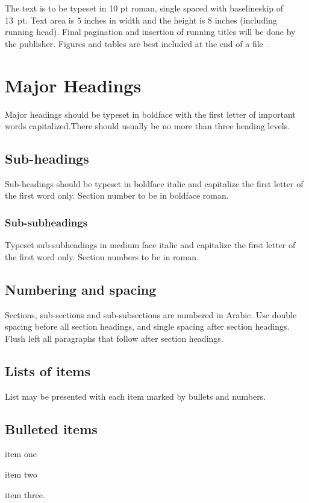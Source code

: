 \documentclass{ws-ijicc}
\begin{document}
The text is to be typeset in 10 pt roman, single spaced with
baselineskip of 13~pt. Text area is 5 inches in width and the height
is 8 inches (including running head).  Final pagination and
insertion of running titles will be done by the publisher. Figures
and tables are best included at the end of a file \cite{}.

\section{Major Headings}
Major headings should be typeset in boldface with the first letter
of important words capitalized.There should usually be no more than
three heading levels.

\subsection{Sub-headings}
Sub-headings should be typeset in boldface italic and capitalize the
first letter of the first word only. Section number to be in boldface
roman.

\subsubsection{Sub-subheadings}
Typeset sub-subheadings in medium face italic and capitalize the first
letter of the first word only. Section numbers to be in roman.

\subsection{Numbering and spacing}
Sections, sub-sections and sub-subsections are numbered in Arabic.
Use double spacing before all section headings, and single spacing
after section headings. Flush left all paragraphs that follow after
section headings.

\subsection{Lists of items}
List may be presented with each item marked by bullets and numbers.

\subsection*{Bulleted items}

\begin{itemlist}
\item item one
\item item two
\item item three.
\end{itemlist}
\end{document}
